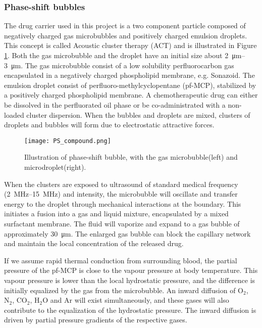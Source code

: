 \subsubsection{Phase-shift bubbles}
The drug carrier used in this project is a two component particle composed of negatively charged gas microbubbles and positively charged emulsion droplets. This concept is called Acoustic cluster therapy (ACT\texttrademark{}) and is illustrated in Figure \ref{Fig:ACT}. Both the gas microbubble and the droplet have an initial size about \SIrange{2}{3}{\micro\metre}. The gas microbubble consist of a low solubility perfluorocarbon gas encapsulated in a negatively charged phospholipid membrane, e.g. Sonazoid\texttrademark{}. The emulsion droplet consist of perfluoro-methylcyclopentane (pf-MCP), stabilized by a positively charged phospholipid membrane. A chemotherapeutic drug can either be dissolved in the perfluorated oil phase or be co-administrated with a non-loaded cluster dispersion. When the bubbles and droplets are mixed, clusters of droplets and bubbles will form due to electrostatic attractive forces.


\begin{figure}[h]
  \centering
  \texttt{[image: PS\_compound.png]}
  \caption{Illustration of phase-shift bubble, with the gas microbubble(left) and microdroplet(right).}
  \label{Fig:ACT}
\end{figure}


When the clusters are exposed to ultrasound of standard medical frequency (\SIrange{2}{15}{\mega\hertz}) and intensity\cite{Hoskins2010}, the microbubble will oscillate and transfer energy to the droplet through mechanical interactions at the boundary. This initiates a fusion into a gas and liquid mixture, encapsulated by a mixed surfactant membrane. The fluid will vaporize and expand to a gas bubble of approximately \SI{30}{\micro\metre}. The enlarged gas bubble can block the capillary network and maintain the local concentration of the released drug.  

If we assume rapid thermal conduction from surrounding blood, the partial pressure of the pf-MCP is close to the vapour pressure at body temperature. This vapour pressure is lower than the local hydrostatic pressure, and the difference is initially equalized by the gas from the microbubble. An inward diffusion of $\mathrm{O}_2$, $\mathrm{N}_2$, $\mathrm{CO}_2$, $\mathrm{H}_2\mathrm{O}$ and $\mathrm{Ar}$ will exist simultaneously, and these gases will also contribute to the equalization of the hydrostatic pressure. The inward diffusion is driven by partial pressure gradients of the respective gases. 

